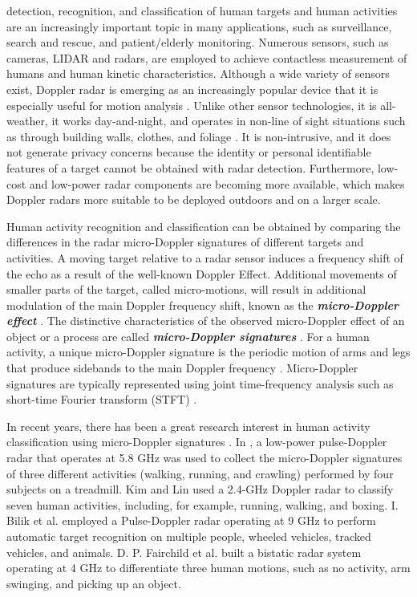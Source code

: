  detection, recognition, and classification of human targets and human activities are an increasingly important topic in many applications, such as surveillance, search and rescue, and patient/elderly monitoring. Numerous sensors, such as cameras, LIDAR \cite{madevice2018} and radars, are employed to achieve contactless measurement of humans and human kinetic characteristics. Although a wide variety of sensors exist, Doppler radar is emerging as an increasingly popular device that it is especially useful for motion analysis \cite{narayanan2015radar}. Unlike other sensor technologies, it is all-weather, it works day-and-night, and operates in non-line of sight situations such as through building walls, clothes, and foliage \cite{ram2008simulation}. It is non-intrusive, and it does not generate privacy concerns because the identity or personal identifiable features of a target cannot be obtained with radar detection. Furthermore, low-cost and low-power radar components are becoming more available, which makes Doppler radars more suitable to be deployed outdoors and on a larger scale.

Human activity recognition and classification can be obtained by comparing the differences in the radar micro-Doppler signatures of different targets and activities. A moving target relative to a radar sensor induces a frequency shift of the echo as a result of the well-known Doppler Effect. Additional movements of smaller parts of the target, called micro-motions, will result in additional modulation of the main Doppler frequency shift, known as the \textit{\textbf{micro-Doppler effect}} \cite{balleri2011classification,dura2011human}. The distinctive characteristics of the observed micro-Doppler effect of an object or a process are called \textit{\textbf{micro-Doppler signatures}} \cite{chen2014micro}. For a human activity, a unique micro-Doppler signature is the periodic motion of arms and legs that produce sidebands to the main Doppler frequency \cite{tivive2013image}. Micro-Doppler signatures are typically represented using joint time-frequency analysis such as short-time Fourier transform (STFT) \cite{tivive2013image,chen2000time}.

  In recent years, there has been a great research interest in human activity classification using micro-Doppler signatures \cite{narayanan2015radar,tivive2013image,garcia2014analysis,kim2015human}. In \cite{ccaugliyan2015micro}, a low-power pulse-Doppler radar that operates at 5.8 GHz was used to collect the micro-Doppler signatures of three different activities (walking, running, and crawling) performed by four subjects on a treadmill. Kim and Lin \cite{kim2009human} used a 2.4-GHz Doppler radar to classify seven human activities, including, for example, running, walking, and boxing. I. Bilik et al. \cite{bilik2006gmm} employed a Pulse-Doppler radar operating at 9 GHz to perform automatic target recognition on multiple people, wheeled vehicles, tracked vehicles, and animals. D. P. Fairchild et al.\cite{fairchild2016multistatic} built a bistatic radar system operating at 4 GHz to differentiate three human motions, such as no activity, arm swinging, and picking up an object.
 
